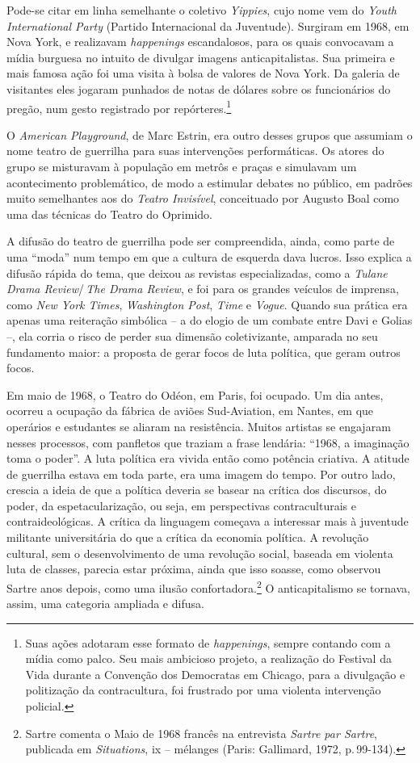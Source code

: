 Pode-se citar em linha semelhante o coletivo {\it Yippies}, cujo nome
vem do {\it Youth International Party} (Partido Internacional da
Juventude). Surgiram em 1968, em Nova York, e realizavam
{\it happenings} escandalosos, para os quais convocavam a mídia
burguesa no intuito de divulgar imagens anticapitalistas. Sua
primeira e mais famosa ação foi uma visita à bolsa de valores de Nova
York. Da galeria de visitantes eles jogaram punhados de notas de
dólares sobre os funcionários do pregão, num gesto registrado por
repórteres.\footnote{Suas ações adotaram esse formato de
  {\it happenings}, sempre contando com a mídia como palco. Seu mais
  ambicioso projeto, a realização do Festival da Vida durante a
  Convenção dos Democratas em Chicago, para a divulgação e
  politização da contracultura, foi frustrado por uma violenta
  intervenção policial.}

O {\it American Playground}, de Marc Estrin, era outro desses grupos que
assumiam o nome teatro de guerrilha para suas intervenções
performáticas. Os atores do grupo se misturavam à população em metrôs e
praças e simulavam um acontecimento problemático, de modo a estimular
debates no público, em padrões muito semelhantes aos do
{\it Teatro Invisível}, conceituado por Augusto Boal como uma das
técnicas do Teatro do Oprimido.

A difusão do teatro de guerrilha pode ser compreendida, ainda,
como parte de uma “moda” num tempo em que a cultura de esquerda dava
lucros. Isso explica a difusão rápida do tema, que deixou as revistas
especializadas, como a {\it Tulane Drama Review}/\,{\it The Drama Review},
e foi para os grandes veículos de imprensa, como {\it New York Times},
{\it Washington Post}, {\it Time} e {\it Vogue}. Quando sua prática era
apenas uma reiteração simbólica -- a do elogio de um combate entre Davi e
Golias --, ela corria o risco de perder sua dimensão coletivizante,
amparada no seu fundamento maior: a proposta de gerar focos de luta
política, que geram outros focos.

Em maio de 1968, o Teatro do Odéon, em Paris, foi ocupado. Um dia antes,
ocorreu a ocupação da fábrica de aviões Sud-Aviation, em Nantes, em que
operários e estudantes se aliaram na resistência. Muitos artistas se
engajaram nesses processos, com panfletos que traziam a frase lendária:
“1968, a imaginação toma o poder”. A luta política era vivida então como
potência criativa. A atitude de guerrilha estava em toda parte, era uma
imagem do tempo. Por outro lado, crescia a ideia de que a política
deveria se basear na crítica dos discursos, do poder, da
espetacularização, ou seja, em perspectivas contraculturais e
contraideológicas. A crítica da linguagem começava a interessar mais à
juventude militante universitária do que a crítica da economia política.
A revolução cultural, sem o desenvolvimento de uma revolução social,
baseada em violenta luta de classes, parecia estar próxima, ainda que
isso soasse, como observou Sartre anos depois, como uma ilusão
confortadora.\footnote{Sartre comenta o Maio de 1968 francês na
  entrevista {\it Sartre par Sartre}, publicada em {\it Situations}, {\sc ix}
  -- mélanges (Paris: Gallimard, 1972, p.\,99-134).} O anticapitalismo se
tornava, assim, uma categoria ampliada e difusa.

